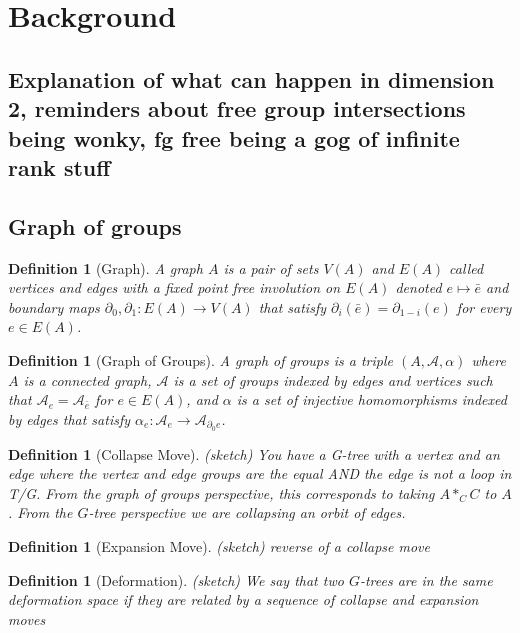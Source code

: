 \documentclass{article}
\theoremstyle{mystyle}
\newtheorem{defn}[thm]{Definition}
\theoremstyle{remark}
\begin{document}
\tableofcontents

\section{Background}
\subsection{Explanation of what can happen in dimension 2, reminders about free group intersections being wonky, fg free being a gog of infinite rank stuff}
\subsection{Graph of groups}
\begin{defn}
    [Graph]
    A graph $A$ is a pair of sets $V(A)$ and $E(A)$ called vertices and edges with a fixed point free involution on $E(A)$ denoted $e\mapsto \bar{e}$ and boundary maps $\partial_0,\partial_1: E(A)\to V(A)$ that satisfy $\partial_{i}(\bar{e})=\partial_{1-i}(e)$ for every $e \in E(A)$.
\end{defn}
\begin{defn}
    [Graph of Groups]
    A graph of groups is a triple $(A,\mathscr A, \alpha)$ where $A$ is a connected graph, $\mathscr A$ is a set of groups indexed by edges and vertices such that $\mathscr A_e=\mathscr A_{\bar e}$ for $e\in E(A)$, and $\alpha$ is a set of injective homomorphisms indexed by edges that satisfy $\alpha_e: \mathscr A_e\to \mathscr A_{\partial_0 e}$.
\end{defn}
\begin{defn}
    [Collapse Move]
    (sketch) You have a G-tree with a vertex and an edge where the vertex and edge groups are the equal AND the edge is not a loop in T/G. From the graph of groups perspective, this corresponds to taking $A*_C C$ to $A$. From the $G$-tree perspective we are collapsing an orbit of edges.
\end{defn}
\begin{defn}
    [Expansion Move]
    (sketch) reverse of a collapse move
\end{defn}
\begin{defn}
    [Deformation]
    \label{defn:deformation}
    (sketch)
    We say that two $G$-trees are in the same deformation space if they are related by a sequence of collapse and expansion moves
\end{defn}
\end{document}
